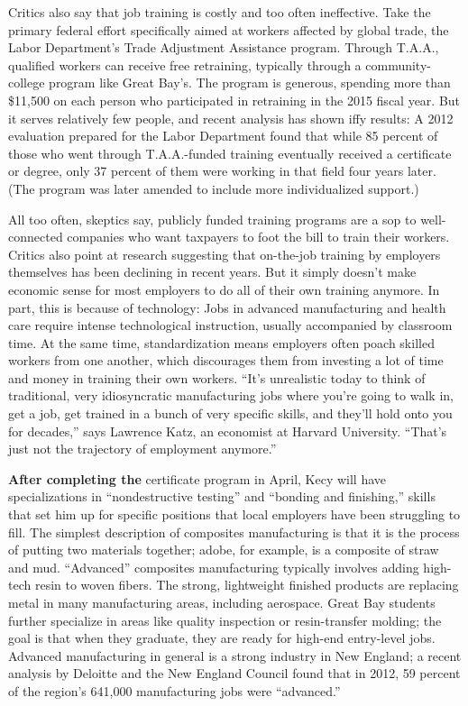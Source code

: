 Critics also say that job training is costly and too often ineffective.
Take the primary federal effort specifically aimed at workers affected
by global trade, the Labor Department's Trade Adjustment Assistance
program. Through T.A.A., qualified workers can receive free retraining,
typically through a community-college program like Great Bay's. The
program is generous, spending more than \$11,500 on each person who
participated in retraining in the 2015 fiscal year. But it serves
relatively few people, and recent analysis has shown iffy results: A
2012 evaluation prepared for the Labor Department found that while 85
percent of those who went through T.A.A.-funded training eventually
received a certificate or degree, only 37 percent of them were working
in that field four years later. (The program was later amended to
include more individualized support.)

All too often, skeptics say, publicly funded training programs are a sop
to well-connected companies who want taxpayers to foot the bill to train
their workers. Critics also point at research suggesting that on-the-job
training by employers themselves has been declining in recent years. But
it simply doesn't make economic sense for most employers to do all of
their own training anymore. In part, this is because of technology: Jobs
in advanced manufacturing and health care require intense technological
instruction, usually accompanied by classroom time. At the same time,
standardization means employers often poach skilled workers from one
another, which discourages them from investing a lot of time and money
in training their own workers. ``It's unrealistic today to think of
traditional, very idiosyncratic manufacturing jobs where you're going to
walk in, get a job, get trained in a bunch of very specific skills, and
they'll hold onto you for decades,'' says Lawrence Katz, an economist at
Harvard University. ``That's just not the trajectory of employment
anymore.''

\textbf{After completing the} certificate program in April, Kecy will
have specializations in ``nondestructive testing'' and ``bonding and
finishing,'' skills that set him up for specific positions that local
employers have been struggling to fill. The simplest description of
composites manufacturing is that it is the process of putting two
materials together; adobe, for example, is a composite of straw and mud.
``Advanced'' composites manufacturing typically involves adding
high-tech resin to woven fibers. The strong, lightweight finished
products are replacing metal in many manufacturing areas, including
aerospace. Great Bay students further specialize in areas like quality
inspection or resin-transfer molding; the goal is that when they
graduate, they are ready for high-end entry-level jobs. Advanced
manufacturing in general is a strong industry in New England; a recent
analysis by Deloitte and the New England Council found that in 2012, 59
percent of the region's 641,000 manufacturing jobs were ``advanced.''

